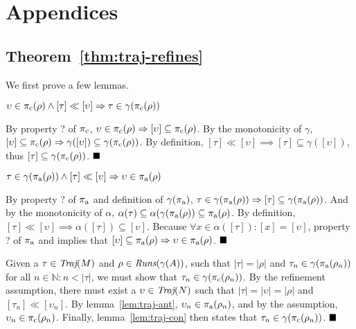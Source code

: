 \section{Appendices}

\subsection{Theorem~\ref{thm:traj-refines}}

We first prove a few lemmas.

\begin{lemma} \label{lem:traj-con}
$\upsilon \in \operatorname{\pi_{\textrm{c}}}(\rho) \wedge [\tau] \ll [\upsilon] \Rightarrow \tau \in \gamma(\operatorname{\pi_{\textrm{c}}}(\rho))$
\end{lemma}

By property ? of $\operatorname{\pi_{\textrm{c}}}$, $\upsilon \in \operatorname{\pi_{\textrm{c}}}(\rho) \Rightarrow [\upsilon] \subseteq \operatorname{\pi_{\textrm{c}}}(\rho)$. By the monotonicity of $\gamma$, $[\upsilon] \subseteq \operatorname{\pi_{\textrm{c}}}(\rho) \Rightarrow \gamma([\upsilon]) \subseteq \gamma(\operatorname{\pi_{\textrm{c}}}(\rho))$. By definition, $[\tau] \ll [\upsilon] \implies [\tau] \subseteq \gamma([\upsilon])$, thus $[\tau] \subseteq \gamma(\operatorname{\pi_{\textrm{c}}}(\rho))$. $\qedbox$

\begin{lemma} \label{lem:traj-ant}
$\tau \in \gamma(\operatorname{\pi_{\textrm{a}}}(\rho)) \wedge [\tau] \ll [\upsilon] \Rightarrow \upsilon \in \operatorname{\pi_{\textrm{a}}}(\rho)$
\end{lemma}

By property ? of $\operatorname{\pi_{\textrm{a}}}$ and definition of $\gamma(\operatorname{\pi_{\textrm{a}}})$, $\tau \in \gamma(\operatorname{\pi_{\textrm{a}}}(\rho)) \Rightarrow [\tau] \subseteq \gamma(\operatorname{\pi_{\textrm{a}}}(\rho))$. And by the monotonicity of $\alpha$, $\alpha(\tau) \subseteq \alpha(\gamma(\operatorname{\pi_{\textrm{a}}}(\rho)) \subseteq \operatorname{\pi_{\textrm{a}}}(\rho)$. By definition, $[\tau] \ll [\upsilon] \implies \alpha([\tau]) \subseteq [\upsilon]$. Because $\forall x \in \alpha([\tau]) : [x] = [\upsilon]$, property ? of $\operatorname{\pi_{\textrm{a}}}$ and implies that $[\upsilon] \subseteq \operatorname{\pi_{\textrm{a}}}(\rho) \Rightarrow \upsilon \in \operatorname{\pi_{\textrm{a}}}(\rho)$. $\qedbox$

Given a $\tau \in \operatorname{\textit{Traj}}(M)$ and $\rho \in \operatorname{\textit{Runs}}(\gamma(A))$, such that $| \tau | = | \rho |$ and $\tau_{n} \in \gamma(\operatorname{\pi_{\textrm{a}}}(\rho_{n}))$ for all $n \in \mathbb{N} : n < | \tau |$, we must show that $\tau_{n} \in \gamma(\operatorname{\pi_{\textrm{c}}}(\rho_{n}))$. By the refinement assumption, there must exist a $\upsilon \in \operatorname{\textit{Traj}}(N)$ such that $| \tau | = | \upsilon | = | \rho |$ and $[\tau_{n}] \ll [\upsilon_{n}]$. By lemma~\ref{lem:traj-ant}, $\upsilon_{n} \in \operatorname{\pi_{\textrm{a}}}(\rho_{n})$, and by the assumption, $\upsilon_{n} \in \operatorname{\pi_{\textrm{c}}}(\rho_{n})$. Finally, lemma~\ref{lem:traj-con} then states that $\tau_{n} \in \gamma(\operatorname{\pi_{\textrm{c}}}(\rho_{n}))$. $\qedbox$


